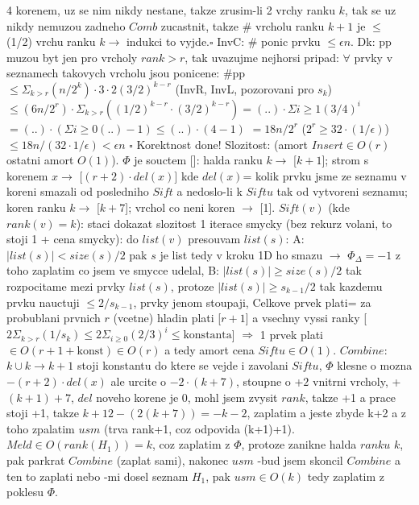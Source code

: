 \documentclass[8pt]{extarticle}
\begin{document}
\begin{multicols*}{4}
korenem, uz se nim nikdy nestane, takze zrusim-li 2 vrchy ranku $k$, tak se uz nikdy nemuzou zadneho $Comb$ zucastnit, takze $\#$ vrcholu ranku $k+1$ je $\leq$ (1/2) vrchu ranku $k \rightarrow$ indukci to vyjde.$\square$ InvC: \# ponic prvku $\leq \epsilon n$. Dk: pp muzou byt jen pro vrcholy $rank > r$, tak uvazujme nejhorsi pripad: $\forall$ prvky v seznamech takovych vrcholu jsou ponicene: \#pp $\leq \Sigma_{k>r}(n/2^k)\cdot3\cdot2(3/2)^{k-r}$ (InvR, InvL, pozorovani pro $s_k$) $\leq (6n/2^r) \cdot \Sigma_{k>r}((1/2)^{k-r}\cdot (3/2)^{k-r}) = (..) \cdot \Sigma{i\geq1} (3/4)^i$ $= (..)\cdot (\Sigma{i\geq0}(..) - 1) \leq (..)\cdot (4-1)$
$= 18n/2^r$ ($2^r \geq 32\cdot(1/\epsilon)$) $\leq 18n/(32\cdot 1/\epsilon) < \epsilon n$ $\square$ Korektnost done! Slozitost: (amort $Insert \in O(r)$ ostatni amort $O(1)$). $\Phi$ je souctem []: halda ranku $k\rightarrow$ [$k+1$]; strom s korenem $x\rightarrow$ [$(r+2)\cdot del(x)]$ kde $del(x)$= kolik prvku jsme ze seznamu v koreni smazali od posledniho $Sift$ a nedoslo-li k $Siftu$ tak od vytvoreni seznamu; koren ranku $k\rightarrow$ [$k+7$]; vrchol co neni koren $\rightarrow$ [1]. $Sift(v)$ (kde $rank(v)=k$): staci dokazat slozitost 1 iterace smycky (bez rekurz volani, to stoji 1 + cena smycky): do $list(v)$ presouvam $list(s)$: A: $|list(s)|<size(s)/2$ pak $s$ je list tedy v kroku 1D ho smazu $\rightarrow$ $\Phi_\Delta = -1$ z toho zaplatim co jsem ve smycce udelal, B: $|list(s)| \geq size(s)/2$ tak rozpocitame mezi prvky $list(s)$, protoze $|list(s)| \geq s_{k-1}/2$ tak kazdemu prvku nauctuji $\leq 2/s_{k-1}$, prvky jenom stoupaji, Celkove prvek plati= za probublani prvnich $r$ (vcetne) hladin plati [$r+1$] a vsechny vyssi ranky [$2\Sigma_{k>r}(1/s_k) \leq 2\Sigma_{i\geq0}(2/3)^i \leq \text{konstanta}$] $\Rightarrow$ 1 prvek plati $\in O(r+1+\text{konst})\in O(r)$ a tedy amort cena $Siftu \in O(1)$. $Combine$: $k \cup k \rightarrow k+1$ stoji konstantu do ktere se vejde i zavolani $Siftu$, $\Phi$ klesne o mozna $-(r+2)\cdot del(x)$ ale urcite o $-2\cdot(k+7)$, stoupne o +$2$ vnitrni vrcholy, +$(k+1)+7$, $del$ noveho korene je 0, mohl jsem zvysit $rank$, takze +1 a prace stoji +1, takze $k+12-(2(k+7))=-k-2$, zaplatim a jeste zbyde k+2 a z toho zpalatim $usm$ (trva rank+1, coz odpovida (k+1)+1). $Meld \in O(rank(H_1))=k$, coz zaplatim z $\Phi$, protoze zanikne halda $ranku$ $k$, pak parkrat $Combine$ (zaplat sami), nakonec $usm$ -bud jsem skoncil $Combine$ a ten to zaplati nebo -mi dosel seznam $H_1$, pak $usm\in O(k)$ tedy zaplatim z poklesu $\Phi$.

\end{multicols*}
\end{document}
